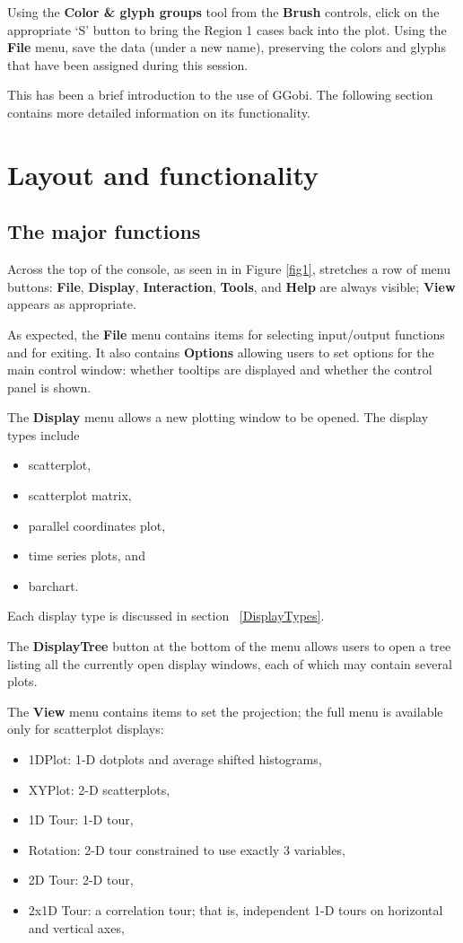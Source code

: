 \documentclass[11pt]{article}
\def\Widget#1{\textbf{#1}}
\begin{document}
Using the \Widget{Color \& glyph groups} tool from the \Widget{Brush}
controls, click on the appropriate `S' button to bring the Region 1
cases back into the plot.  Using the \Widget{File} menu, save the data
(under a new name), preserving the colors and glyphs that have been
assigned during this session.

This has been a brief introduction to the use of GGobi. The following
section contains more detailed information on its functionality.

\section{Layout and functionality}

\subsection{The major functions}

Across the top of the console, as seen in in Figure \ref{fig1},
stretches a row of menu buttons: \Widget{File}, \Widget{Display},
\Widget{Interaction}, \Widget{Tools}, and \Widget{Help} are always visible;
\Widget{View} appears as appropriate.

As expected, the \Widget{File} menu contains items for selecting
input/output functions and for exiting.  It also contains
\Widget{Options} allowing users to set options for the main control
window: whether tooltips are displayed and whether the control panel
is shown.

The \Widget{Display} menu allows a new plotting window to be opened. 
The display types include
\begin{itemize}
\itemsep 0em
\item scatterplot,
\item scatterplot matrix, 
\item parallel coordinates plot, 
\item time series plots, and
\item barchart.
\end{itemize}

Each display type
is discussed in section ~\ref{DisplayTypes}.

The \Widget{DisplayTree} button at the bottom of the menu allows users to
open a tree listing all the currently open display windows, each of
which may contain several plots.

The \Widget{View} menu contains items to set the projection; the
full menu is available only for scatterplot displays:
\begin{itemize}
\itemsep 0em
\item 1DPlot: 1-D dotplots and average shifted histograms,
\item XYPlot: 2-D scatterplots,
\item 1D Tour: 1-D tour,
\item Rotation: 2-D tour constrained to use exactly 3 variables,
\item 2D Tour: 2-D tour,
\item 2x1D Tour: a correlation tour; that is, independent 1-D tours on
      horizontal and vertical axes,
\end{itemize}
\end{document}
